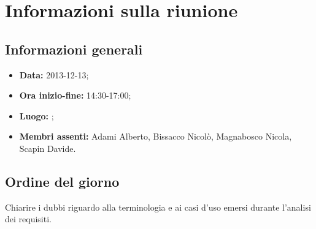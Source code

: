 \section{Informazioni sulla riunione}
\label{inforiunione}
\subsection{Informazioni generali}
\label{infogenerali}
\begin{itemize}
\item\textbf{Data:} 2013-12-13;
\item\textbf{Ora inizio-fine:} 14:30-17:00;
\item\textbf{Luogo:} \proposerName;
\item\textbf{Membri assenti:} Adami Alberto, Bissacco Nicolò, Magnabosco Nicola, Scapin Davide.
\end{itemize}

\subsection{Ordine del giorno}
\label{odg}
Chiarire i dubbi riguardo alla terminologia e ai casi d'uso emersi durante l'analisi dei requisiti.
